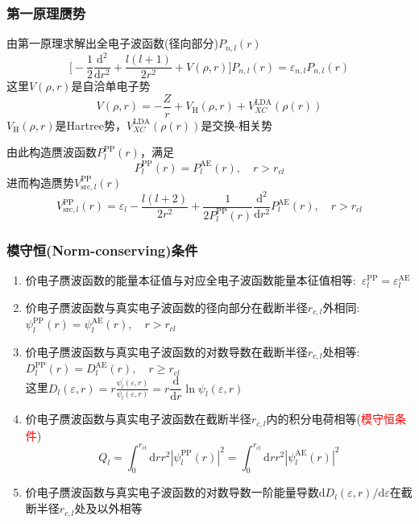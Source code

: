 \documentclass[cjk,slidestop,compress,mathserif,blue]{beamer}
\begin{document}
\frame
{
	\frametitle{第一原理赝势}
		由第一原理求解出全电子波函数(径向部分)$P_{n,l}(r)$
			\begin{displaymath}
				\bigg[-\dfrac12\dfrac{\mathrm{d}^2}{\mathrm{d}r^2}+\dfrac{l(l+1)}{2r^2}+V(\rho,r)\bigg]P_{n,l}(r)=\varepsilon_{n,l}P_{n,l}(r)
			\end{displaymath}
			这里$V(\rho,r)$是自洽单电子势
			$$V(\rho,r)=-\frac{Z}r+V_{\mathrm H}(\rho,r)+V_{XC}^{\mathrm{LDA}}(\rho(r))$$
			$V_{\mathrm H}(\rho,r)$是\textrm{Hartree}势，$V_{XC}^{\mathrm{LDA}}(\rho(r))$是交换-相关势

			由此构造赝波函数$P_l^{\mathrm{PP}}(r)$，满足
			$$P_l^{\mathrm{PP}}(r)=P_l^{\mathrm{AE}}(r),\quad r>r_{cl}$$
			进而构造赝势$V_{\mathrm{src},l}^{\mathrm{PP}}(r)$
			$$V_{\mathrm{src},l}^{\mathrm{PP}}(r)=\varepsilon_l-\dfrac{l(l+2)}{2r^2}+\dfrac{1}{2P_l^{\mathrm{PP}}(r)}\dfrac{\mathrm{d}^2}{\mathrm{d}r^2}P_l^{\mathrm{AE}}(r),\quad r>r_{cl}$$
}

\frame
{
	\frametitle{模守恒\textrm{(Norm-conserving)}条件}
	\begin{enumerate}
		\item 价电子赝波函数的能量本征值与对应全电子波函数能量本征值相等:~$\varepsilon_l^{\mathrm{PP}}=\varepsilon_l^{\mathrm{AE}}$
		\item 价电子赝波函数与真实电子波函数的径向部分在截断半径$r_{c,l}$外相同:~$\psi_l^{\mathrm{PP}}(r)=\psi_l^{\mathrm{AE}}(r),\quad r>r_{cl}$
		\item 价电子赝波函数与真实电子波函数的对数导数在截断半径$r_{c,l}$处相等:~$D_l^{\mathrm{PP}}(r)=D_l^{\mathrm{AE}}(r),\quad r\geqslant r_{cl}$\\
		这里$D_l(\varepsilon,r)=r\frac{\psi_l^{\prime}(\varepsilon,r)}{\psi_l(\varepsilon,r)}=r\dfrac{\mathrm{d}}{\mathrm{d}r}\ln\psi_l(\varepsilon,r)$
		\item 价电子赝波函数与真实电子波函数在截断半径$r_{c,l}$内的积分电荷相等(\textcolor{red}{模守恒条件})
			$$Q_l=\int_0^{r_{cl}}\mathrm{d}rr^2|\psi_l^{\mathrm{PP}}(r)|^2=\int_0^{r_{cl}}\mathrm{d}rr^2|\psi_l^{\mathrm{AE}}(r)|^2$$
		\item 价电子赝波函数与真实电子波函数的对数导数一阶能量导数$\mathrm{d}D_l(\varepsilon,r)/\mathrm{d}\varepsilon$在截断半径$r_{c,l}$处及以外相等
	\end{enumerate}
}
\end{document}
